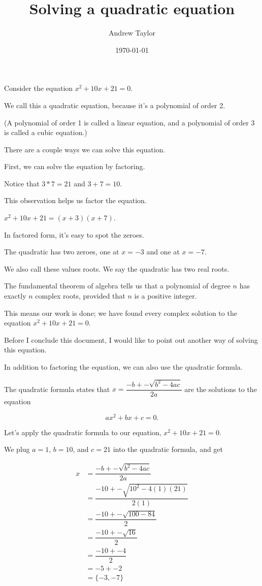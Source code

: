 \documentclass{article}
\title{Solving a quadratic equation}
\author{Andrew Taylor}
\date{\today}
\begin{document}
\maketitle
Consider the equation $x^2 + 10x + 21 = 0$.

We call this a quadratic equation, because it's a polynomial of order 2.

(A polynomial of order 1 is called a linear equation, and a polynomial of order 3 is called a cubic equation.)

There are a couple ways we can solve this equation.

First, we can solve the equation by factoring.

Notice that $3 * 7 = 21$ and $3 + 7 = 10$.

This observation helps us factor the equation.

$x^2 + 10x + 21 = (x + 3)(x + 7)$.

In factored form, it's easy to spot the zeroes.

The quadratic has two zeroes, one at $x = -3$ and one at $x = -7$.

We also call these values roots. We say the quadratic has two real roots.

The fundamental theorem of algebra tells us that a polynomial of degree $n$ has exactly $n$ complex roots, provided that $n$ is a positive integer.

This means our work is done; we have found every complex solution to the equation $x^2 + 10x + 21 = 0$.

Before I conclude this document, I would like to point out another way of solving this equation.

In addition to factoring the equation, we can also use the quadratic formula.

The quadratic formula states that $x = \dfrac{-b +- \sqrt{b^2 - 4ac}}{2a}$ are the solutions to the equation

$$ ax^2 + bx + c = 0.$$

Let's apply the quadratic formula to our equation, $x^2 + 10x + 21 = 0$.

We plug $a = 1$, $b = 10$, and $c = 21$ into the quadratic formula, and get

\begin{align*}
x &= \dfrac{-b +- \sqrt{b^2 - 4ac}}{2a} \\
&= \dfrac{-10 +- \sqrt{10^2 - 4(1)(21)}}{2(1)} \\
&= \dfrac{-10 +- \sqrt{100 - 84}}{2} \\
&= \dfrac{-10 +- \sqrt{16}}{2} \\
&= \dfrac{-10 +- 4}{2} \\
&= -5 +- 2 \\
&= \{-3, -7\}
\end{align*}
\end{document}
